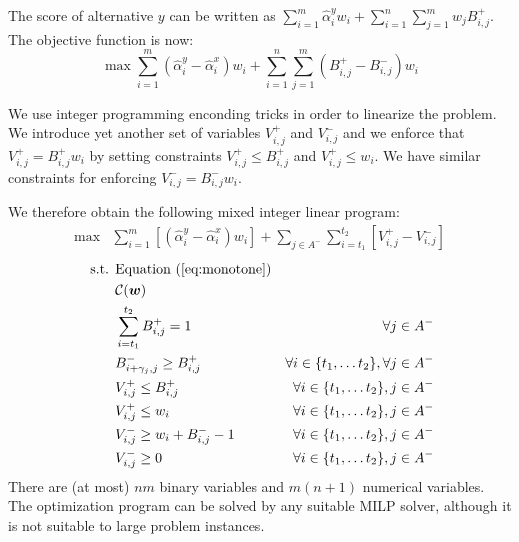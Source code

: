 
The score of alternative $y$ can be written as $\sum_{i = 1}^{m} \hat{\alpha}_{i}^{y}  w_{i} + \sum_{i=1}^{n} \sum_{j=1}^{m} w_{j} B_{i,j}^{+}$.
The objective function is now:
 \[ \max \sum_{i = 1}^{m} (\hat{\alpha}_{i}^{y} - \hat{\alpha}_{i}^{x}) w_{i} +  \sum_{i=1}^{n} \sum_{j=1}^{m} (B_{i,j}^{+} - B_{i,j}^{-})  w_i \]

We use integer programming enconding tricks in order to linearize the problem.
We introduce yet another set of variables  $V_{i,j}^{+} $  and $V_{i,j}^{-}$ %
and we enforce that $V_{i,j}^{+} = B^{+}_{i,j} w_i$ by setting constraints $V_{i,j}^{+} \leq B^{+}_{i,j}$ and $V_{i,j}^{+}  \leq w_i$.
We have similar constraints for enforcing $V_{i,j}^{-} = B^{-}_{i,j} w_i$.

We therefore obtain the following mixed integer linear program:
\newcommand{\C}{\mathcal{C}}
\begin{align}
\max & \sum_{i=1}^m  [(\hat{\alpha}_{i}^{y} - \hat{\alpha}_{i}^{x}) w_{i}] +
  \sum_{j \in A^{-}} \sum_{i=t_{1}}^{t_{2}}  [V_{i,j}^{+} - V_{i,j}^{-}]
\end{align}
\begin{align}
\text{ s.t. } &  \text{Equation } (\ref{eq:monotone}) & \\
&  \C(\w) &  \\
& \sum_{i=t_{1}}^{t_{2}} B_{i,j}^{+} = 1 & \forall j \in A^{-} \\
& B_{i+\gamma_{j},j}^{-} \geq B_{i,j}^{+} & \forall i \in \{ t_{1}, \ldots t_{2}\}, \forall j \in A^{-} \\
& V_{i,j}^{+} \leq B_{i,j}^{+}  & \forall i \in \{ t_{1}, \ldots t_{2}\}, j \in A^{-} \\
& V_{i,j}^{+} \leq w_i & \forall i \in \{ t_{1}, \ldots t_{2}\}, j \in A^{-} \\
& V_{i,j}^{-} \geq w_{i} + B_{i,j}^{-} - 1 & \forall i \in \{ t_{1}, \ldots t_{2}\}, j \in A^{-}\\
& V_{i,j}^{-} \geq 0 & \forall i \in \{ t_{1}, \ldots t_{2}\}, j \in A^{-}
\end{align} 
There are (at most) $nm$ binary variables and $m(n+1)$ numerical variables.
The optimization program can be solved by any suitable MILP solver, although it is not suitable to large problem instances.

